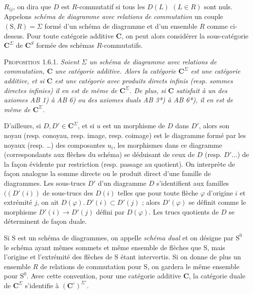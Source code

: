 
\noindent $R_{ij}$, on dira que $D$ est $R$-commutatif si tous les $D(L)$
$(L\in R)$ sont nuls. Appelons \textit{schéma de diagramme avec relations de
commutation} un couple $(\mathrm{S},R)=\Sigma$ formé d'un schéma de diagramme et d'un
ensemble $R$ comme ci-dessus. Pour toute catégorie additive $\mathbf{C}$, on peut alors
considérer la sous-catégorie $\mathbf{C}^\Sigma$ de $\mathbf{C}^S$ formée des schémas
$R$-commutatifs.

\textsc{Proposition 1.6.1.} \textit{Soient $\Sigma$ un schéma de
diagramme avec relations de commutation, $\mathbf{C}$ une catégorie additive. Alors la
catégorie $\mathbf{C}^\Sigma$ est une catégorie additive, et si $\mathbf{C}$ est une catégorie
avec produits directs infinis (resp. sommes directes infinies) il en est de
même de $\mathbf{C}^\Sigma$. De plus, si $\mathbf{C}$ satisfait à un des axiomes \textup{AB 1)} à \textup{AB 6)}
ou des axiomes duals \textup{AB 3*)} à \textup{AB 6*)}, il en est de même de $\mathbf{C}^\Sigma$.}

D'ailleurs, si $D,D'\in \mathbf{C}^\Sigma$, et si $u$ est un morphisme de $D$ dans
$D'$, alors son noyau (resp. conoyau, resp. image, resp. coimage) est le
diagramme formé par les noyaux (resp. \ldots) des composantes $u_i$, les
morphismes dans ce diagramme (correspondants aux flèches du schéma) se
déduisant de ceux de $D$ (resp. $D'\ldots$) de la façon évidente par
restriction (resp. passage au quotient). On interprète de façon analogue la
somme directe ou le produit direct d'une famille de diagrammes. Les sous-trucs
$D'$ d'un diagramme $D$ s'identifient aux familles $((D'(i))$ de sous-trucs des
$D(i)$ telles que pour toute flèche $\varphi$ d'origine $i$ et extrémité $j$,
on ait $D(\varphi).\,D'(i)\subset D'(j)$ ; alors $D'(\varphi)$ se définit comme
le morphisme $D'(i)\to D'(j)$ défini par $D(\varphi)$. Les trucs
quotients de $D$ se déterminent de façon duale.

Si $\mathrm{S}$ est un schéma de diagrammes, on appelle \textit{schéma dual} et on
désigne par $\mathrm{S}^0$ le schéma ayant mêmes sommets et même ensemble de flèches
que $\mathrm{S}$, mais l'origine et l'extrémité des flèches de $\mathrm{S}$ étant intervertis. Si
on donne de plus un ensemble $R$ de relations de commutation pour $\mathrm{S}$, on
gardera le même ensemble pour $\mathrm{S}^0$. Avec cette convention, pour une
catégorie additive $\mathbf{C}$, la catégorie duale de $\mathbf{C}^\Sigma$ s'identifie à
$(\mathbf{C}^\circ)^{\Sigma^\circ}$.


